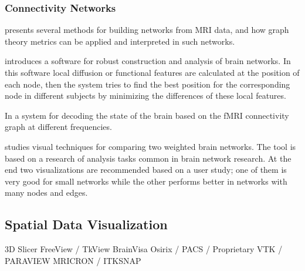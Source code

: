 \subsubsection{Connectivity Networks}

\autocite{rubinov_complex_2010} presents several methods for building networks from MRI data, and how graph theory metrics can be applied and interpreted in such networks.

\autocite{li_visual_2012} introduces a software for robust construction and analysis of brain networks. In this software local diffusion or functional features are calculated at the position of each node, then the system tries to find the best position for the corresponding node in different subjects by minimizing the differences of these local features.

In \autocite{richiardi_decoding_2011} a system for decoding the state of the brain based on the fMRI connectivity graph at different frequencies.

\autocite{alper_weighted_2013} studies visual techniques for comparing two weighted brain networks. The tool is based on a research of analysis tasks common in brain network research. At the end two visualizations are recommended based on a user study; one of them is very good for small networks while the other performs better in networks with many nodes and edges.

\subsection{Spatial Data Visualization}

3D Slicer
FreeView / TkView
BrainVisa
Osirix / PACS / Proprietary
VTK / PARAVIEW
MRICRON / ITKSNAP







